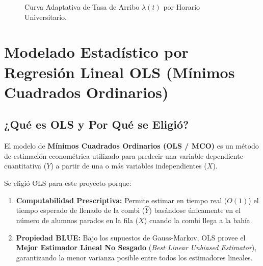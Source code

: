 \documentclass[12pt,letterpaper]{article}
\begin{document}
\begin{figure}[H]
	\centering
	\caption{Curva Adaptativa de Tasa de Arribo $\lambda(t)$ por Horario Universitario.}
	\label{fig:curva_poisson}
\end{figure}

\newpage
\section{Modelado Estadístico por Regresión Lineal OLS (Mínimos Cuadrados Ordinarios)}

\subsection{¿Qué es OLS y Por Qué se Eligió?}
El modelo de \textbf{Mínimos Cuadrados Ordinarios (OLS / MCO)} es un método de estimación econométrica utilizado para predecir una variable dependiente cuantitativa ($Y$) a partir de una o más variables independientes ($X$).

Se eligió OLS para este proyecto porque:
\begin{enumerate}
	\item \textbf{Computabilidad Prescriptiva:} Permite estimar en tiempo real ($O(1)$) el tiempo esperado de llenado de la combi ($\widehat{Y}$) basándose únicamente en el número de alumnos parados en la fila ($X$) cuando la combi llega a la bahía.
	\item \textbf{Propiedad BLUE:} Bajo los supuestos de Gauss-Markov, OLS provee el \textbf{Mejor Estimador Lineal No Sesgado} (\textit{Best Linear Unbiased Estimator}), garantizando la menor varianza posible entre todos los estimadores lineales.
\end{enumerate}
\end{document}
